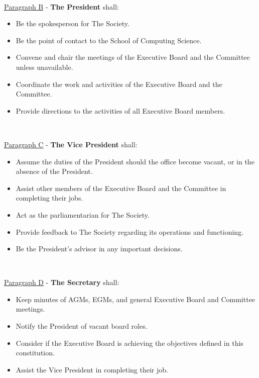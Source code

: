 ~

\underline{Paragraph B} - \textbf{The President} shall:

\begin{itemize}

    \item{Be the spokesperson for The Society.}

    \item{Be the point of contact to the School of Computing Science.}

    \item{Convene and chair the meetings of the Executive Board and the Committee unless unavailable.}

    \item{Coordinate the work and activities of the Executive Board and the Committee.}

    \item{Provide directions to the activities of all Executive Board members.}

\end{itemize}

~

\underline{Paragraph C} - \textbf{The Vice President} shall:

\begin{itemize}

    \item{Assume the duties of the President should the office become vacant, or in the absence of the President.}

    \item{Assist other members of the Executive Board and the Committee in completing their jobs.}

    \item{Act as the parliamentarian for The Society.}

    \item{Provide feedback to The Society regarding its operations and functioning.}

    \item{Be the President's advisor in any important decisions.}

\end{itemize}

~

\underline{Paragraph D} - \textbf{The Secretary} shall:

\begin{itemize}

    \item{Keep minutes of AGMs, EGMs, and general Executive Board and Committee meetings.}

    \item{Notify the President of vacant board roles.}

    \item{Consider if the Executive Board is achieving the objectives defined in this constitution.}

    \item{Assist the Vice President in completing their job.}

\end{itemize}

